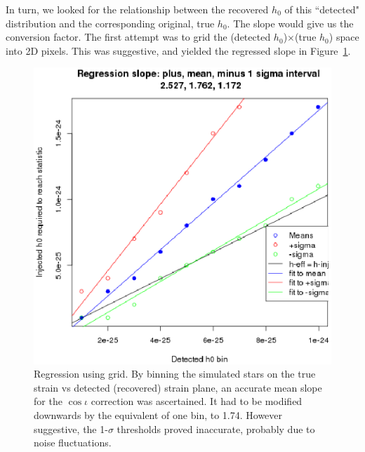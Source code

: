 In turn, we looked for the relationship between the recovered $h_0$ of this ``detected" distribution and the corresponding original, true $h_0$. The slope would give us the conversion factor. The first attempt was to grid the (detected $h_0$)$\times$(true $h_0$) space into 2D pixels. This was suggestive, and yielded the regressed slope in Figure~\ref{fig:plotheffvsh0trueregressions}.

\begin{figure}
\begin{center}
\includegraphics[trim=0 10 10 5, clip, width=0.72\paperwidth,height=0.48\paperheight]{PlotHeffVsH0TrueRegressions.eps}
\caption{Regression using grid. By binning the simulated stars on the true strain vs detected (recovered) strain plane, an accurate mean slope for the $\cos \iota$ correction was ascertained. It had to be modified downwards by the equivalent of one bin, to 1.74. However suggestive, the 1-$\sigma$ thresholds proved inaccurate, probably due to noise fluctuations.
\label{fig:plotheffvsh0trueregressions}}
\end{center}
\end{figure}


